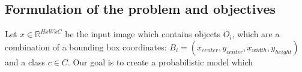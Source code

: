 \cite{Gasperini_2022}

\subsection{Formulation of the problem and objectives}
Let $x \in \mathbb{R}^{HxWxC}$ be the input image which contains objects $O_i$, which are a combination of a bounding box coordinates: $B_i = (x_{center}, y_{center}, x_{width}, y_{height})$ and a class $c \in C$. Our goal is to create a probabilistic model which

\cite{Gasperini_2022}








